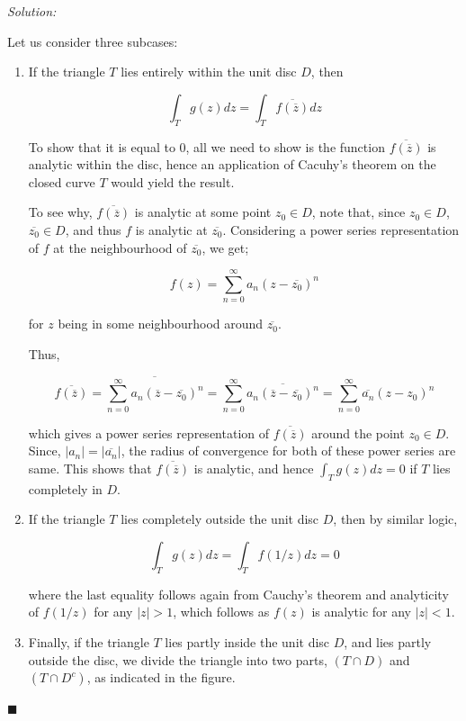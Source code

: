 \documentclass[12pt]{article}
\theoremstyle{definition}
\newenvironment{answer}{\textit{Solution: }\quad }{ \hfill $\blacksquare$}
\numberwithin{equation}{section}
\begin{document}
\begin{answer}
\begin{enumerate}
		Let us consider three subcases:

		\begin{enumerate}
			\item If the triangle $T$ lies entirely within the unit disc $D$, then 
			
			$$\displaystyle\int_T g(z) dz = \displaystyle\int_T \overline{f(\overline{z})} dz$$
			
			To show that it is equal to $0$, all we need to show is the function $\overline{f(\overline{z})}$ is analytic within the disc, hence an application of Cacuhy's theorem on the closed curve $T$ would yield the result.

			To see why, $\overline{f(\overline{z})}$ is analytic at some point $z_0 \in D$, note that, since $z_0 \in D$, $\overline{z_0} \in D$, and thus $f$ is analytic at $\overline{z_0}$. Considering a power series representation of $f$ at the neighbourhood of $\overline{z_0}$, we get;

			$$
			f(z) = \sum_{n = 0}^{\infty} a_n (z - \overline{z_0})^n
			$$

			for $z$ being in some neighbourhood around $\overline{z_0}$. 

			Thus,

			$$
			\overline{f(\overline{z})} = \overline{\sum_{n = 0}^{\infty} a_n (\overline{z} - \overline{z_0})^n} = \sum_{n = 0}^{\infty} \overline{a_n (\overline{z} - \overline{z_0})^n} = \sum_{n = 0}^{\infty} \overline{a_n} (z - z_0)^n
			$$

			which gives a power series representation of $\overline{f(\overline{z})}$ around the point $z_0 \in D$. Since, $\vert a_n \vert = \vert \overline{a_n} \vert$, the radius of convergence for both of these power series are same. This shows that $\overline{f(\overline{z})}$ is analytic, and hence $\int_T g(z)dz = 0$ if $T$ lies completely in $D$.

			\item If the triangle $T$ lies completely outside the unit disc $D$, then by similar logic,
			
			$$
			\int_T g(z)dz = \int_T f(1/z)dz = 0
			$$

			where the last equality follows again from Cauchy's theorem and analyticity of $f(1/z)$ for any $\vert z \vert > 1$, which follows as $f(z)$ is analytic for any $\vert z \vert < 1$.

			\item  Finally, if the triangle $T$ lies partly inside the unit disc $D$, and lies partly outside the disc, we divide the triangle into two parts, $(T \cap D)$ and $(T \cap D^c)$, as indicated in the figure.
			

\end{enumerate}
\end{enumerate}
\end{answer}
\end{document}
